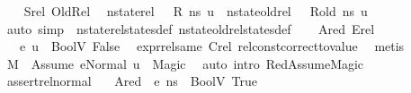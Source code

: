 \begin{isabellebody}
\ \ \isamarkupfalse%
\ Srel\ OldRel\ \isamarkupfalse%
\ {\isachardoublequoteopen}nstate{\isacharunderscore}{\kern0pt}rel\ {\isasymLambda}\ {\isasymLambda}{\isacharprime}{\kern0pt}\ R\ ns\ u{\isachardoublequoteclose}\ \ {\isachardoublequoteopen}nstate{\isacharunderscore}{\kern0pt}old{\isacharunderscore}{\kern0pt}rel\ {\isasymLambda}\ {\isasymLambda}{\isacharprime}{\kern0pt}\ R{\isacharunderscore}{\kern0pt}old\ ns\ u{\isachardoublequoteclose}\ \ \ \ \isanewline
\ \ \ \ \isamarkupfalse%
\ {\isacharparenleft}{\kern0pt}auto\ simp{\isacharcolon}{\kern0pt}\ \ nstate{\isacharunderscore}{\kern0pt}rel{\isacharunderscore}{\kern0pt}states{\isacharunderscore}{\kern0pt}def\ nstate{\isacharunderscore}{\kern0pt}old{\isacharunderscore}{\kern0pt}rel{\isacharunderscore}{\kern0pt}states{\isacharunderscore}{\kern0pt}def{\isacharparenright}{\kern0pt}\isanewline
\ \ \isamarkupfalse%
\ Ared\ Erel\ \isamarkupfalse%
\ {\isachardoublequoteopen}{\isasymLambda}{\isacharprime}{\kern0pt}{\isacharcomma}{\kern0pt}{\isasymGamma}{\isacharcomma}{\kern0pt}{\isasymOmega}\ {\isasymturnstile}\ {\isasymlangle}e{}{\isacharcomma}{\kern0pt}\ u{\isasymrangle}\ {\isasymDown}\ {\isacharparenleft}{\kern0pt}BoolV\ False{\isacharparenright}{\kern0pt}{\isachardoublequoteclose}\ \isamarkupfalse%
\ expr{\isacharunderscore}{\kern0pt}rel{\isacharunderscore}{\kern0pt}same{\isacharparenleft}{\kern0pt}{}{\isacharparenright}{\kern0pt}\ Crel\ rel{\isacharunderscore}{\kern0pt}const{\isacharunderscore}{\kern0pt}correct{\isacharunderscore}{\kern0pt}to{\isacharunderscore}{\kern0pt}value\ \isamarkupfalse%
\ metis\isanewline
\ \ \isamarkupfalse%
\ {\isachardoublequoteopen}M{\isacharcomma}{\kern0pt}{\isasymLambda}{\isacharprime}{\kern0pt}{\isacharcomma}{\kern0pt}{\isasymGamma}{\isacharcomma}{\kern0pt}{\isasymOmega}\ {\isasymturnstile}\ {\isasymlangle}Assume\ e{}{\isacharcomma}{\kern0pt}Normal\ u{\isasymrangle}\ {\isasymrightarrow}\ Magic{\isachardoublequoteclose}\ \isamarkupfalse%
\ {\isacharparenleft}{\kern0pt}auto\ intro{\isacharcolon}{\kern0pt}\ RedAssumeMagic{\isacharparenright}{\kern0pt}\isanewline
{}\isamarkupfalse%
%
\endisatagproof
{\isafoldproof}%
%
\isadelimproof
\isanewline
%
\endisadelimproof
\isanewline
{}\isamarkupfalse%
\ assert{\isacharunderscore}{\kern0pt}rel{\isacharunderscore}{\kern0pt}normal{\isacharcolon}{\kern0pt}\isanewline
\ \ \ Ared{\isacharcolon}{\kern0pt}{\isachardoublequoteopen}{\isasymLambda}{\isacharcomma}{\kern0pt}{\isasymGamma}{\isacharcomma}{\kern0pt}{\isasymOmega}\ {\isasymturnstile}\ {\isasymlangle}e{}{\isacharcomma}{\kern0pt}\ ns{\isasymrangle}\ {\isasymDown}\ {\isacharparenleft}{\kern0pt}BoolV\ True{\isacharparenright}{\kern0pt}{\isachardoublequoteclose}\ \isanewline

\end{isabellebody}
